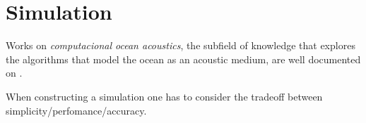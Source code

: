 \section{Simulation}

Works on \textit{computacional ocean
acoustics}, the subfield of knowledge that explores the algorithms that model
the ocean as an acoustic medium, are well documented on
\cite{Etter2013,Etter2013}.

When constructing a simulation one has to consider the tradeoff between
simplicity/perfomance/accuracy.